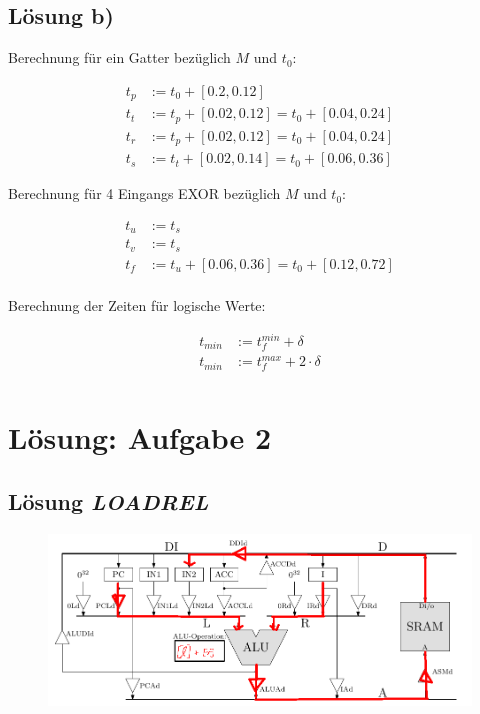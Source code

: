 \documentclass{scrartcl}[9pt, a4paper]
\begin{document}
\subsection*{Lösung b)}

Berechnung für ein Gatter bezüglich $M$ und $t_0$:

\begin{align*}
	t_p & := t_0 + [0.2, 0.12]                       \\
	t_t & := t_p + [0.02, 0.12] = t_0 + [0.04, 0.24] \\
	t_r & := t_p + [0.02, 0.12] = t_0 + [0.04, 0.24] \\
	t_s & := t_t + [0.02, 0.14] = t_0 + [0.06, 0.36]
\end{align*}

Berechnung für 4 Eingangs EXOR bezüglich $M$ und $t_0$:

\begin{align*}
	t_u & := t_s                                     \\
	t_v & := t_s                                     \\
	t_f & := t_u + [0.06, 0.36] = t_0 + [0.12, 0.72] \\
\end{align*}

Berechnung der Zeiten für logische Werte:

\begin{align*}
	t_{min} & := t_f^{min} + \delta         \\
	t_{min} & := t_f^{max} + 2 \cdot \delta \\
\end{align*}

\pagebreak
\section*{Lösung: Aufgabe 2}

\subsection*{Lösung \emph{LOADREL}}

\begin{figure}[h]
	\centering
	\includegraphics[width=.8\textwidth]{figs/retil1}
\end{figure}
\end{document}
